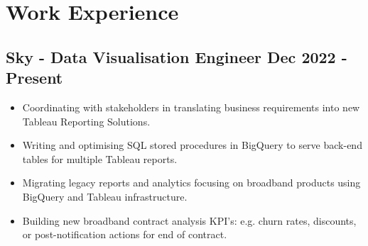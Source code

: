 \documentclass[a4paper,9pt]{article}
\begin{document}
\section*{Work Experience}
\subsection*{\textbf{Sky - Data Visualisation Engineer} \hfill  Dec 2022 - Present}
\begin{itemize}[noitemsep]

    \item Coordinating with stakeholders in translating business requirements into new Tableau Reporting Solutions.
    \item Writing and optimising SQL stored procedures in BigQuery to serve back-end tables for multiple Tableau reports.
    \item Migrating legacy reports and analytics focusing on broadband products using BigQuery and Tableau infrastructure.
    \item Building new broadband contract analysis KPI's: e.g. churn rates, discounts, or post-notification actions for end of contract.

\end{itemize}
\end{document}
